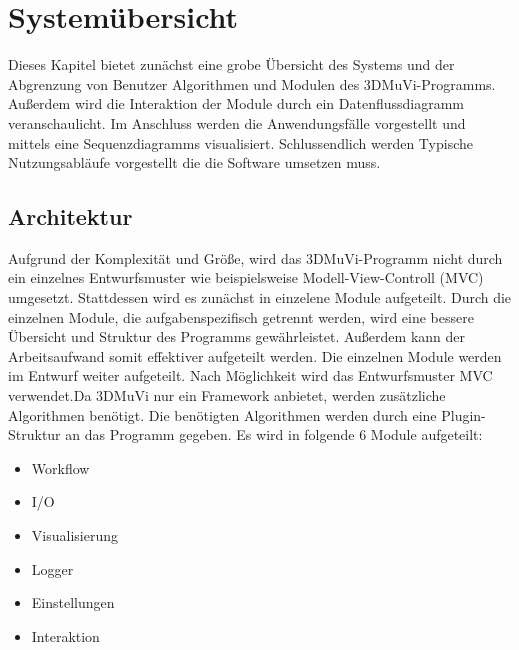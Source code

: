 \section{Systemübersicht}

Dieses Kapitel bietet zunächst eine grobe Übersicht des Systems und der Abgrenzung von Benutzer Algorithmen und Modulen des 3DMuVi-Programms. Außerdem wird die Interaktion der Module durch ein Datenflussdiagramm veranschaulicht. Im Anschluss werden die Anwendungsfälle vorgestellt und mittels eine Sequenzdiagramms visualisiert. Schlussendlich werden Typische Nutzungsabläufe vorgestellt die die Software umsetzen muss.
\subsection{Architektur}

Aufgrund der Komplexität und Größe, wird das 3DMuVi-Programm nicht durch ein einzelnes Entwurfsmuster wie beispielsweise Modell-View-Controll (MVC) umgesetzt. Stattdessen wird es zunächst in einzelene Module aufgeteilt.
Durch die einzelnen Module, die aufgabenspezifisch getrennt werden, wird eine bessere Übersicht und Struktur des Programms gewährleistet. Außerdem kann der Arbeitsaufwand somit effektiver aufgeteilt werden.\newline
Die einzelnen Module werden im Entwurf weiter aufgeteilt. Nach Möglichkeit wird das Entwurfsmuster MVC verwendet.\newline Da 3DMuVi nur ein Framework anbietet, werden zusätzliche Algorithmen benötigt.
Die benötigten Algorithmen werden durch eine Plugin-Struktur an das Programm gegeben.\newline \newline
Es wird in folgende 6 Module aufgeteilt:
\begin{itemize}
\item Workflow
\item I/O
\item Visualisierung
\item Logger
\item Einstellungen
\item Interaktion
\end{itemize}

